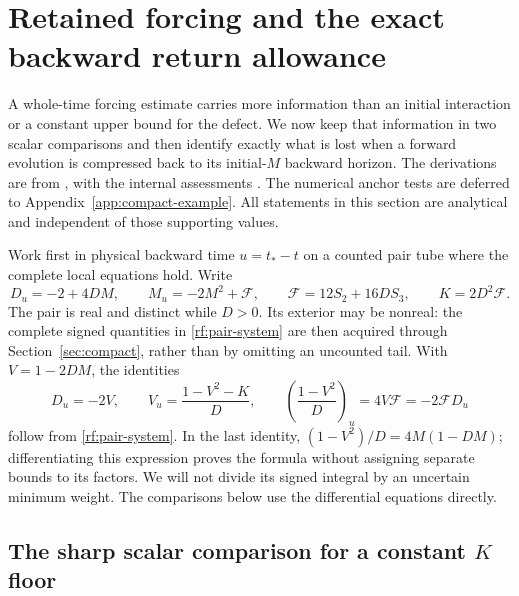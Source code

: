 \section{Retained forcing and the exact backward return allowance}
\label{sec:retained-forcing}

A whole-time forcing estimate carries more information than an initial
interaction or a constant upper bound for the defect. We now keep that
information in two scalar comparisons and then identify exactly what is
lost when a forward evolution is compressed back to its initial-$M$
backward horizon. The derivations are from \cite{BakerCM32,BakerCM34},
with the internal assessments \cite{BakerCMReview29,BakerCMReview30}.
The numerical anchor tests are deferred to Appendix~\ref{app:compact-example}.
All statements in this section are analytical and independent of those
supporting values.

Work first in physical backward time $u=t_*-t$ on a counted pair tube
where the complete local equations hold. Write
\begin{equation}
 D_u=-2+4DM,\qquad M_u=-2M^2+\mathcal F,\qquad
 \mathcal F=12S_2+16DS_3,\qquad K=2D^2\mathcal F.
 \label{rf:pair-system}
\end{equation}
The pair is real and distinct while $D>0$. Its exterior may be nonreal:
the complete signed quantities in \eqref{rf:pair-system} are then
acquired through Section~\ref{sec:compact}, rather than by omitting an
uncounted tail. With $V=1-2DM$, the identities
\begin{equation}
 D_u=-2V,\qquad V_u=\frac{1-V^2-K}{D},\qquad
 \left(\frac{1-V^2}{D}\right)_u=4V\mathcal F
                                  =-2\mathcal F D_u
 \label{rf:transient-identity}
\end{equation}
follow from \eqref{rf:pair-system}. In the last identity,
$(1-V^2)/D=4M(1-DM)$; differentiating this expression proves the
formula without assigning separate bounds to its factors. We will not
divide its signed integral by an uncertain minimum weight. The
comparisons below use the differential equations directly.

\subsection{The sharp scalar comparison for a constant \texorpdfstring{$K$}{K} floor}

